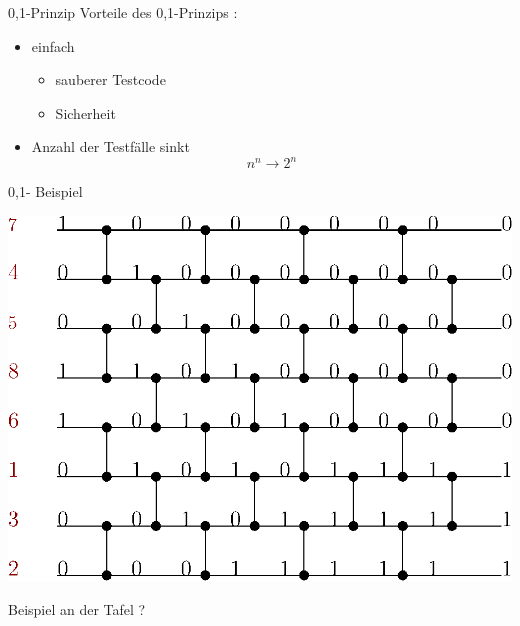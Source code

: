 \documentclass[ucs,9pt]{beamer}
\begin{document}
\begin{frame}{0,1-Prinzip}
Vorteile des 0,1-Prinzips : 
\begin{itemize}
\item einfach 
	\begin{itemize}
		\item sauberer Testcode
		\item Sicherheit
	\end{itemize}
\item Anzahl der Testfälle sinkt \\ 
$$  n^n\rightarrow 2^n $$
\end{itemize}
\end{frame}

\begin{frame}{0,1- Beispiel}
 {
\begin{center}
\includegraphics[scale=0.8]{01beispiel.eps}
\end{center}
}
 {\begin{center} {\color{green}Beispiel an der Tafel ?}\end{center} }
\end{frame}
\end{document}
